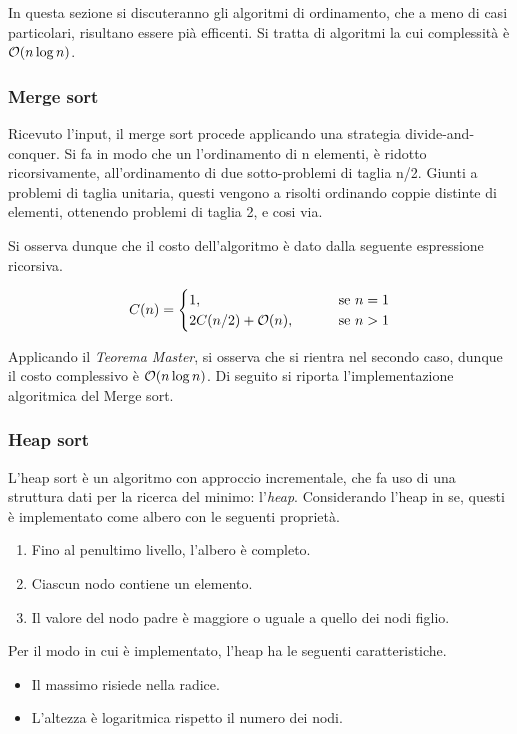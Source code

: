\documentclass{subfiles}
\begin{document}
In questa sezione si discuteranno gli algoritmi di ordinamento, che a meno di casi particolari, risultano essere pià efficenti.
Si tratta di algoritmi la cui complessità è \(\order{n \log n}\).

\subsubsection{Merge sort}
Ricevuto l'input, il merge sort procede applicando una strategia divide-and-conquer.
Si fa in modo che un l'ordinamento di n elementi, è ridotto ricorsivamente, all'ordinamento di due sotto-problemi di taglia n/2.
Giunti a problemi di taglia unitaria, questi vengono a risolti ordinando coppie distinte di elementi, ottenendo problemi di taglia 2, e cosi via.

Si osserva dunque che il costo dell'algoritmo è dato dalla seguente espressione ricorsiva.

\[
    C(n) = \begin{cases}
        1, \qquad                    & \text{se} n = 1 \\
        2 C(n/2) + \order{n}, \qquad & \text{se} n > 1
    \end{cases}\]

\noindent Applicando il \emph{Teorema Master}, si osserva che si rientra nel secondo caso, dunque il costo complessivo è \(\order{n \log n}\).
Di seguito si riporta l'implementazione algoritmica del Merge sort.


\clearpage

\subsubsection{Heap sort}
L'heap sort è un algoritmo con approccio incrementale, che fa uso di una struttura dati per la ricerca del minimo: l'\emph{heap}.
Considerando l'heap in se, questi è implementato come albero con le seguenti proprietà.
\begin{enumerate}
    \item Fino al penultimo livello, l'albero è completo.
    \item Ciascun nodo contiene un elemento.
    \item Il valore del nodo padre è maggiore o uguale a quello dei nodi figlio.
\end{enumerate}

\noindent Per il modo in cui è implementato, l'heap ha le seguenti caratteristiche.
\begin{itemize}
    \item Il massimo risiede nella radice.
    \item L'altezza è logaritmica rispetto il numero dei nodi.
\end{itemize}
\end{document}
